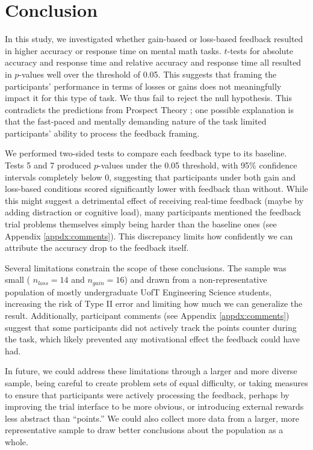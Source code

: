 \documentclass[12pt]{exam}
\begin{document}
\section{Conclusion}
In this study, we investigated whether gain-based or loss-based feedback resulted in higher accuracy or response time on mental math tasks. $t$-tests for absolute accuracy and response time and relative accuracy and response time all resulted in $p$-values well over the threshold of 0.05. This suggests that framing the participants’ performance in terms of losses or gains does not meaningfully impact it for this type of task. We thus fail to reject the null hypothesis. This contradicts the predictions from Prospect Theory \cite{prospect-theory}; one possible explanation is that the fast-paced and mentally demanding nature of the task limited participants' ability to process the feedback framing.\newline

We performed two-sided tests to compare each feedback type to its baseline. Tests 5 and 7 produced $p$-values under the 0.05 threshold, with 95\% confidence intervals completely below 0, suggesting that participants under both gain and loss-based conditions scored significantly lower with feedback than without. While this might suggest a detrimental effect of receiving real-time feedback (maybe by adding distraction or cognitive load), many participants mentioned the feedback trial problems themselves simply being harder than the baseline ones (see Appendix \ref{appdx:comments}). This discrepancy limits how confidently we can attribute the accuracy drop to the feedback itself.\newline

Several limitations constrain the scope of these conclusions. The sample was small ( $n_{loss}=14$ and $n_{gain} = 16$) and drawn from a non-representative population of mostly undergraduate UofT Engineering Science students, increasing the risk of Type II error \cite{lin2018bias}\cite{sample-size-effect} and limiting how much we can generalize the result. Additionally, participant comments (see Appendix \ref{appdx:comments}) suggest that some participants did not actively track the points counter during the task, which likely prevented any motivational effect the feedback could have had. 

In future, we could address these limitations through a larger and more diverse sample, being careful to create problem sets of equal difficulty, or taking measures to ensure that participants were actively processing the feedback, perhaps by improving the trial interface to be more obvious, or introducing external rewards less abstract than “points.” We could also collect more data from a larger, more representative sample to draw better conclusions about the population as a whole.
\end{document}

